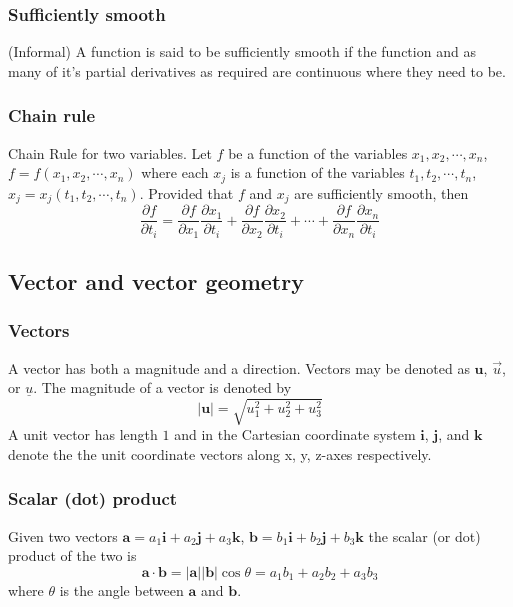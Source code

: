 \documentclass[12pt]{article}
\begin{document}
		\subsubsection{Sufficiently smooth}
		\begin{defn}
			(Informal) A function is said to be sufficiently smooth if the function and as many of it's partial derivatives
			as required are continuous where they need to be.
		\end{defn}
		
		\subsubsection{Chain rule}
		\begin{defn}
			Chain Rule for two variables. Let $f$ be a function of the variables $x_1, x_2, \cdots , x_n$, $f = f(x_1, x_2, \cdots , x_n)$ 
			where each $x_j$ is a function of the variables $t_1, t_2, \cdots , t_n$, $x_j = x_j(t_1, t_2, \cdots , t_n)$. Provided
			that $f$ and $x_j$ are sufficiently smooth, then
			\[
				\frac{\partial f}{\partial t_i} = \frac{\partial f}{\partial x_1}\frac{\partial x_1}{\partial t_i} + 
												\frac{\partial f}{\partial x_2}\frac{\partial x_2}{\partial t_i} + 
												\cdots +
												\frac{\partial f}{\partial x_n}\frac{\partial x_n}{\partial t_i}
			\]
		\end{defn}


	\subsection{Vector and vector geometry}

		\subsubsection{Vectors}
		\begin{defn}
			A vector has both a magnitude and a direction. Vectors may be denoted as $\mathbf{u}$, $\vec{u}$, or $\underline{u}$.
			The magnitude of a vector is denoted by 
			\[
				|\mathbf{u}| = \sqrt{u_1^2 + u_2^2 + u_3^2}
			\]
			A unit vector has length $1$ and in the Cartesian coordinate system $\mathbf{i}$, $\mathbf{j}$, and $\mathbf{k}$ denote the the unit 
			coordinate vectors along x, y, z-axes respectively.
		\end{defn}
		
		\subsubsection{Scalar (dot) product}
		\begin{defn}
			Given two vectors $\mathbf{a} = a_1 \mathbf{i} + a_2 \mathbf{j} + a_3 \mathbf{k}$,
			$\mathbf{b} = b_1 \mathbf{i} + b_2 \mathbf{j} + b_3 \mathbf{k}$ the scalar (or dot) product of the two is
			\[
				\mathbf{a} \cdot \mathbf{b} = |\mathbf{a}||\mathbf{b}|\cos{\theta} = a_1 b_1 + a_2 b_2 + a_3 b_3
			\]
			where $\theta$ is the angle between $\mathbf{a}$ and $\mathbf{b}$.
		\end{defn}
		
\end{document}
